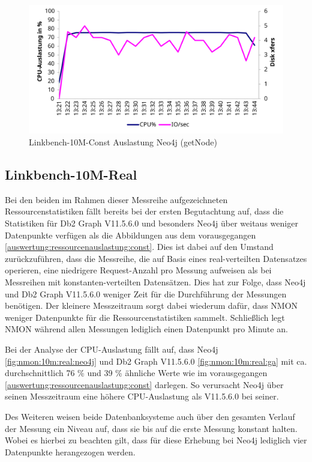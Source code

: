 \begin{figure}[!ht]
    \centering
    \includegraphics[width=\textwidth]{images/stats/linkbench-10m-const_neo4j.pdf}
    \caption{Linkbench-10M-Const Auslastung Neo4j (getNode)}
    \label{fig:nmon:10m:const:neo4j}
\end{figure}

\subsection{Linkbench-10M-Real}
\label{auswertung:ressourcenauslastung:real}
Bei den beiden im Rahmen dieser Messreihe aufgezeichneten Ressourcenstatistiken fällt bereits bei der ersten Begutachtung auf, dass die Statistiken für Db2 Graph V11.5.6.0 und besonders Neo4j über weitaus weniger Datenpunkte verfügen als die Abbildungen aus dem vorausgegangen \autoref{auswertung:ressourcenauslastung:const}. Dies ist dabei auf den Umstand zurückzuführen, dass die Messreihe, die auf Basis eines real-verteilten Datensatzes operieren, eine niedrigere Request-Anzahl pro Messung aufweisen als bei Messreihen mit konstanten-verteilten Datensätzen. Dies hat zur Folge, dass Neo4j und Db2 Graph V11.5.6.0 weniger Zeit für die Durchführung der Messungen benötigen. Der kleinere Messzeitraum sorgt dabei wiederum dafür, dass NMON weniger Datenpunkte für die Ressourcenstatistiken sammelt. Schließlich legt NMON während allen Messungen lediglich einen Datenpunkt pro Minute an. 

Bei der Analyse der CPU-Auslastung fällt auf, dass Neo4j \autoref{fig:nmon:10m:real:neo4j} und Db2 Graph V11.5.6.0 \autoref{fig:nmon:10m:real:ga} mit ca. durchschnittlich 76 \% und 39 \% ähnliche Werte wie im vorausgegangen \autoref{auswertung:ressourcenauslastung:const} darlegen. So verursacht Neo4j über seinen Messzeitraum eine höhere CPU-Auslastung als V11.5.6.0 bei seiner.   

Des Weiteren weisen beide Datenbanksysteme auch über den gesamten Verlauf der Messung ein Niveau auf, dass sie bis auf die erste Messung konstant halten. Wobei es hierbei zu beachten gilt, dass für diese Erhebung bei Neo4j lediglich vier Datenpunkte herangezogen werden.

